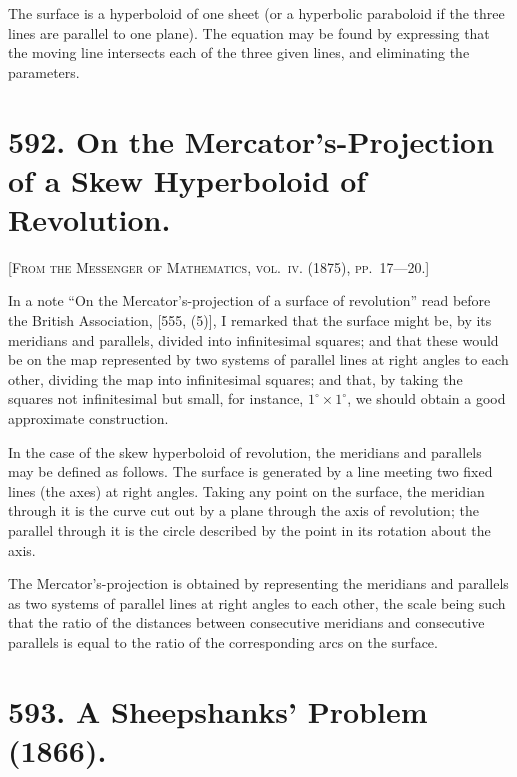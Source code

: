 \documentclass[11pt,a4paper]{book}
\begin{document}
The surface is a hyperboloid of one sheet (or a hyperbolic paraboloid if the three lines are parallel to one plane). The equation may be found by expressing that the moving line intersects each of the three given lines, and eliminating the parameters.

\newpage

\section*{592. On the Mercator's-Projection of a Skew Hyperboloid of Revolution.}

\noindent\textsc{[From the Messenger of Mathematics, vol.~\textsc{iv}. (1875), pp.~17---20.]}

\medskip

\noindent In a note ``On the Mercator's-projection of a surface of revolution'' read before the British Association, [555, (5)], I remarked that the surface might be, by its meridians and parallels, divided into infinitesimal squares; and that these would be on the map represented by two systems of parallel lines at right angles to each other, dividing the map into infinitesimal squares; and that, by taking the squares not infinitesimal but small, for instance, $1^\circ \times 1^\circ$, we should obtain a good approximate construction.

In the case of the skew hyperboloid of revolution, the meridians and parallels may be defined as follows. The surface is generated by a line meeting two fixed lines (the axes) at right angles. Taking any point on the surface, the meridian through it is the curve cut out by a plane through the axis of revolution; the parallel through it is the circle described by the point in its rotation about the axis.

The Mercator's-projection is obtained by representing the meridians and parallels as two systems of parallel lines at right angles to each other, the scale being such that the ratio of the distances between consecutive meridians and consecutive parallels is equal to the ratio of the corresponding arcs on the surface.

\newpage

\section*{593. A Sheepshanks' Problem (1866).}
\end{document}
